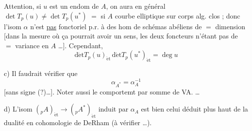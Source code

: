 Attention, si $u$ est un endom de $A$, on aura
en général $\det T_p(u)\ne\det T_p(u^*)$
$=$ si $A$ courbe elliptique sur corps alg. clos ; donc
l'isom $\alpha$ n'est \uline{pas} fonctoriel p.r. à des
hom de schémas abéliens de $=$ dimension
[dans la mesure où ça pourrait avoir un
sens, les deux foncteurs n'étant pas de $=$
variance en $A$ \ldots]. Cependant, 
\[
\boxed{\operatorname{d\acute et} T_p(u)_{\mathrm{\acute et}}\,\operatorname{d\acute et} T_p(u^*)_{\mathrm{\acute et}}=\deg u}
\]

c) Il faudrait vérifier que
\[
\alpha_{A^*}=\alpha_A^{-1}
\]
[sans signe (?)\ldots]. Noter aussi le
comportemt par somme de VA. \ldots

d) L'isom $({}_pA)_{\mathrm{\acute et}}\mathbin{\to}({}_pA^*)_{\mathrm{\acute et}}$ induit par
$\alpha_A$ est bien celui déduit plus haut de
la dualité en cohomologie de DeRham
(à vérifier \ldots).
